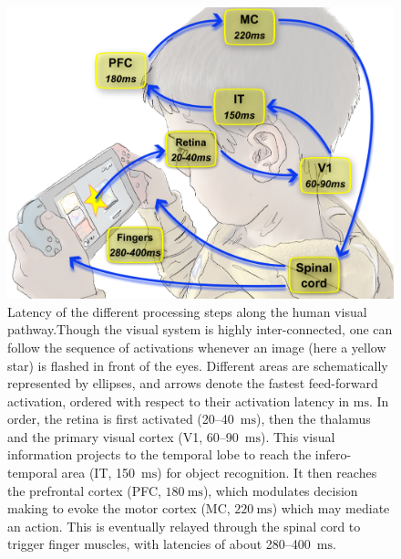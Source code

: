 \documentclass[brainsci, %
               review,accept,pdftex,moreauthors
               ]{Definitions/mdpi}
\newcommand{\ms}{\si{\milli\second}}%
\begin{document}
\begin{figure}[H]
\includegraphics[width=.75\textwidth]{figures/visual-latency.pdf}
\caption{
  Latency of the different processing steps along the human visual pathway.Though the visual system is highly inter-connected, one can follow the sequence of activations whenever an image (here a yellow star) is flashed in front of the eyes. Different areas are schematically represented by ellipses, and arrows denote the fastest feed-forward activation, ordered with respect to their activation latency in $\ms$. In order, the retina is first activated (20--40~$\ms$), then the thalamus and the primary visual cortex (V1, 60--90~$\ms$). This visual information  projects to the temporal lobe to reach the infero-temporal area (IT, 150~$\ms$) for object recognition. It then reaches the prefrontal cortex (PFC, $180~\ms$), which modulates decision making to evoke the motor cortex (MC, $220~\ms$) which may mediate an action. This is eventually relayed through the spinal cord to trigger finger muscles, with latencies of about 280--400~$\ms$.}\label{fig:thorpe}
\end{figure}
\vspace{-6pt}
\end{document}
